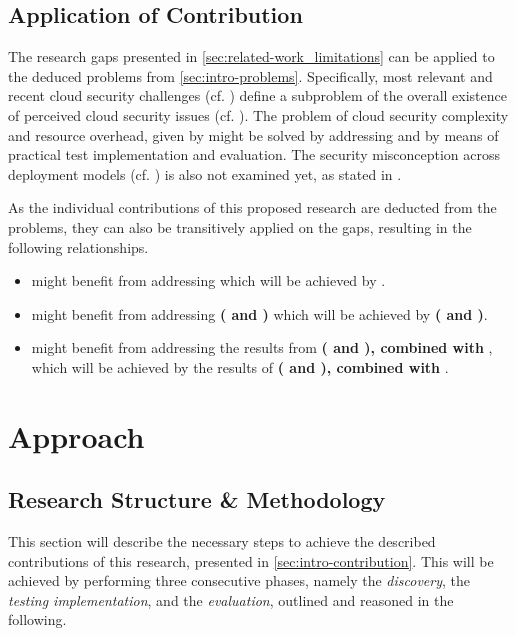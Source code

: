 \section{Application of Contribution} \label{sec:related-work_contribution}

The research gaps presented in \autoref{sec:related-work_limitations} can be  applied to the deduced problems from \autoref{sec:intro-problems}. Specifically, most relevant and recent cloud security challenges (cf. ) define a subproblem of the overall existence of perceived cloud security issues (cf. ). The problem of cloud security complexity and resource overhead, given by  might be solved by addressing  and  by means of practical test implementation and evaluation. The security misconception across deployment models (cf. ) is also not examined yet, as stated in .

As the individual contributions of this proposed research are deducted from the problems, they can also be transitively applied on the gaps, resulting in the following relationships.

\begin{itemize}
	\item \textbf{} might benefit from addressing \textbf{} which will be achieved by \textbf{}.
	\item \textbf{} might benefit from addressing \textbf{( and )} which will be achieved by \textbf{( and )}.
	\item \textbf{} might benefit from addressing the results from \textbf{( and ), combined with }, which will be achieved by the results of \textbf{( and ), combined with }.
\end{itemize}

\chapter{Approach} 
\label{ch:approach}

	\section{Research Structure \& Methodology} \label{sec:approach-structure}
	This section will describe the necessary steps to achieve the described contributions of this research, presented in \autoref{sec:intro-contribution}. This will be achieved by performing three consecutive phases, namely the \textit{discovery}, the \textit{testing implementation}, and the \textit{evaluation}, outlined and reasoned in the following.
	

